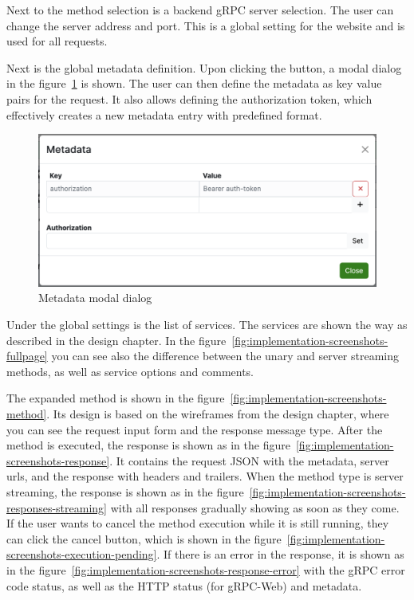 Next to the method selection is a backend gRPC server selection.
The user can change the server address and port.
This is a global setting for the website and is used for all requests.

Next is the global metadata definition.
Upon clicking the button, a modal dialog in the figure~\ref{fig:implementation-screenshots-metadata-modal} is shown.
The user can then define the metadata as key value pairs for the request.
It also allows defining the authorization token, which effectively creates a new metadata entry with predefined format.

\begin{figure}[hbt!]
    \centering
    \captionsetup{justification=centering}
    \includegraphics[width=1.0\textwidth]{images/implementation/screenshots/metadata-modal}
    \caption{Metadata modal dialog}
    \label{fig:implementation-screenshots-metadata-modal}
\end{figure}

Under the global settings is the list of services.
The services are shown the way as described in the design chapter.
In the figure~\ref{fig:implementation-screenshots-fullpage} you can see also the difference between the unary and server streaming methods, as well as service options and comments.

The expanded method is shown in the figure~\ref{fig:implementation-screenshots-method}.
Its design is based on the wireframes from the design chapter, where you can see the request input form and the response message type.
After the method is executed, the response is shown as in the figure~\ref{fig:implementation-screenshots-response}.
It contains the request JSON with the metadata, server urls, and the response with headers and trailers.
When the method type is server streaming, the response is shown as in the figure~\ref{fig:implementation-screenshots-responses-streaming} with all responses gradually showing as soon as they come.
If the user wants to cancel the method execution while it is still running, they can click the cancel button, which is shown in the figure~\ref{fig:implementation-screenshots-execution-pending}.
If there is an error in the response, it is shown as in the figure~\ref{fig:implementation-screenshots-response-error} with the gRPC error code status, as well as the HTTP status (for gRPC-Web) and metadata.


